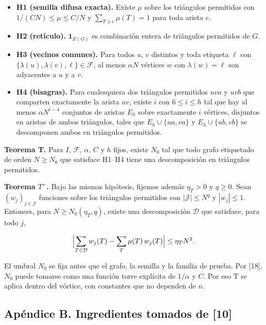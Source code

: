 \documentclass[spanish,11pt,a4paper]{article}
\providecommand{\tightlist}{\setlength{\itemsep}{0pt}\setlength{\parskip}{0pt}}
\begin{document}
\begin{itemize}
\tightlist
\item
  \textbf{H1 (semilla difusa exacta).} Existe \(\mu\) sobre los triángulos permitidos con \(1/(CN)\le\mu\le C/N\) y \(\sum_{T\ni e}\mu(T)=1\) para toda arista \(e\).
\item
  \textbf{H2 (retículo).} \(\mathbf 1_{E(G)}\) es combinación entera de triángulos permitidos de \(G\).
\item
  \textbf{H3 (vecinos comunes).} Para todos \(u\), \(v\) distintos y toda etiqueta \(\ell\) con \(\{\lambda(u),\lambda(v),\ell\}\in\mathcal F\), al menos \(\alpha N\) vértices \(w\) con \(\lambda(w)=\ell\) son adyacentes a \(u\) y a \(v\).
\item
  \textbf{H4 (bisagras).} Para cualesquiera dos triángulos permitidos \(uva\) y \(uvb\) que comparten exactamente la arista \(uv\), existe \(i\) con \(6\le i\le h\) tal que hay al menos \(\alpha N^{i-4}\) conjuntos de aristas \(E_h\) sobre exactamente \(i\) vértices, disjuntos en aristas de ambos triángulos, tales que \(E_h\cup\{ua,va\}\) y \(E_h\cup\{ub,vb\}\) se descomponen ambos en triángulos permitidos.
\end{itemize}

\textbf{Teorema T.} Para \(I\), \(\mathcal F\), \(\alpha\), \(C\) y \(h\) fijos, existe \(N_0\) tal que todo grafo etiquetado de orden \(N\ge N_0\) que satisface H1--H4 tiene una descomposición en triángulos permitidos.

\textbf{Teorema \(T^+\).} Bajo las mismas hipótesis, fijemos además \(\eta_T>0\) y \(q\ge0\). Sean \((w_j)_{j\in\mathcal J}\) funciones sobre los triángulos permitidos con \(|\mathcal J|\le N^q\) y \(|w_j|\le1\). Entonces, para \(N\ge N_0(\eta_T,q)\), existe una descomposición \(\mathcal D\) que satisface, para todo \(j\),

\nopagebreak[4]
\[\Bigl|\sum_{T\in\mathcal D}w_j(T)-\sum_T\mu(T)\,w_j(T)\Bigr|\le\eta_T N^2.\]

El umbral \(N_0\) se fija antes que el grafo, la semilla y la familia de prueba. Por {[}18{]}, \(N_0\) puede tomarse como una función torre explícita de \(1/\alpha\) y \(C\). Por eso T se aplica dentro del vórtice, con constantes que no dependen de \(n\).

\subsection{Apéndice B. Ingredientes tomados de {[}10{]}}\label{apuxe9ndice-b.-ingredientes-tomados-de-10}
\end{document}
